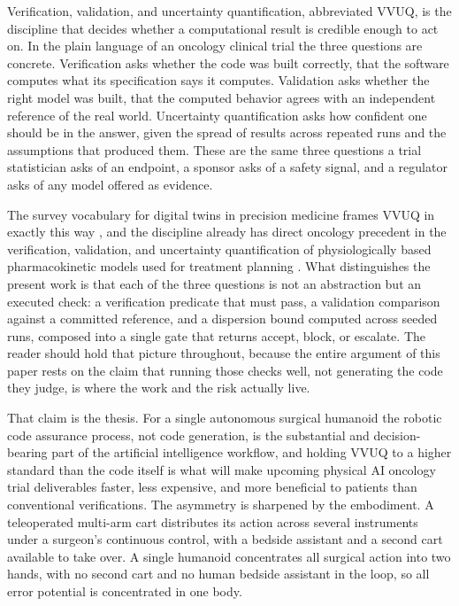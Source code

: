 
Verification, validation, and uncertainty quantification, abbreviated VVUQ, is
the discipline that decides whether a computational result is credible enough to
act on. In the plain language of an oncology clinical trial the three questions
are concrete. Verification asks whether the code was built correctly, that the
software computes what its specification says it computes. Validation asks
whether the right model was built, that the computed behavior agrees with an
independent reference of the real world. Uncertainty quantification asks how
confident one should be in the answer, given the spread of results across
repeated runs and the assumptions that produced them. These are the same three
questions a trial statistician asks of an endpoint, a sponsor asks of a safety
signal, and a regulator asks of any model offered as evidence. 

The survey
vocabulary for digital twins in precision medicine frames VVUQ in exactly this
way \cite{sel2025vvuq}, and the discipline already has direct oncology precedent
in the verification, validation, and uncertainty quantification of
physiologically based pharmacokinetic models used for treatment planning
\cite{zaid2025pbpk}. What distinguishes the present work is that each of the
three questions is not an abstraction but an executed check: a verification
predicate that must pass, a validation comparison against a committed reference,
and a dispersion bound computed across seeded runs, composed into a single gate
that returns accept, block, or escalate. The reader should hold that picture
throughout, because the entire argument of this paper rests on the claim that
running those checks well, not generating the code they judge, is where the work
and the risk actually live.

That claim is the thesis. For a single autonomous surgical humanoid the robotic
code assurance process, not code generation, is the substantial and
decision-bearing part of the artificial intelligence workflow, and holding VVUQ
to a higher standard than the code itself is what will make upcoming physical AI
oncology trial deliverables faster, less expensive, and more beneficial to
patients than conventional verifications. The asymmetry is sharpened by the
embodiment. A teleoperated multi-arm cart distributes its action across several
instruments under a surgeon's continuous control, with a bedside assistant and a
second cart available to take over. A single humanoid concentrates all surgical
action into two hands, with no second cart and no human bedside assistant in the
loop, so all error potential is concentrated in one body. 

